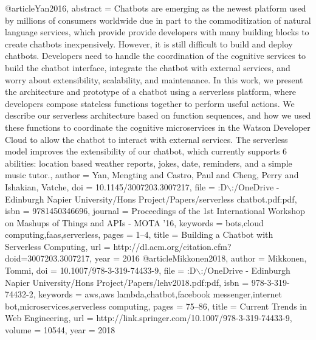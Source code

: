 @article{Yan2016,
      abstract = {Chatbots are emerging as the newest platform used by millions of consumers worldwide due in part to the commoditization of natural language services, which provide provide developers with many building blocks to create chatbots inexpensively. However, it is still difficult to build and deploy chatbots. Developers need to handle the coordination of the cognitive services to build the chatbot interface, integrate the chatbot with external services, and worry about extensibility, scalability, and maintenance. In this work, we present the architecture and prototype of a chatbot using a serverless platform, where developers compose stateless functions together to perform useful actions. We describe our serverless architecture based on function sequences, and how we used these functions to coordinate the cognitive microservices in the Watson Developer Cloud to allow the chatbot to interact with external services. The serverless model improves the extensibility of our chatbot, which currently supports 6 abilities: location based weather reports, jokes, date, reminders, and a simple music tutor.},
      author = {Yan, Mengting and Castro, Paul and Cheng, Perry and Ishakian, Vatche},
      doi = {10.1145/3007203.3007217},
      file = {:D$\backslash$:/OneDrive - Edinburgh Napier University/Hons Project/Papers/serverless chatbot.pdf:pdf},
      isbn = {9781450346696},
      journal = {Proceedings of the 1st International Workshop on Mashups of Things and APIs - MOTA '16},
      keywords = {bots,cloud computing,faas,serverless},
      pages = {1--4},
      title = {{Building a Chatbot with Serverless Computing}},
      url = {http://dl.acm.org/citation.cfm?doid=3007203.3007217},
      year = {2016}
}
@article{Mikkonen2018,
      author = {Mikkonen, Tommi},
      doi = {10.1007/978-3-319-74433-9},
      file = {:D$\backslash$:/OneDrive - Edinburgh Napier University/Hons Project/Papers/lehv2018.pdf:pdf},
      isbn = {978-3-319-74432-2},
      keywords = {aws,aws lambda,chatbot,facebook messenger,internet bot,microservices,serverless computing},
      pages = {75--86},
      title = {{Current Trends in Web Engineering}},
      url = {http://link.springer.com/10.1007/978-3-319-74433-9},
      volume = {10544},
      year = {2018}
}
